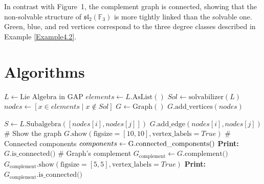 \documentclass[11pt]{amsart}
\theoremstyle{plain}
\def\F{\mathbb{F}}
\begin{document}
In contrast with Figure~1, the complement graph is connected, showing that the non-solvable structure of $\mathfrak{sl}_2(\F_3)$ is more tightly linked than the solvable one. Green, blue,  and red vertices correspond to the three degree classes described in Example \ref{Example4.2}.
 

\section{Algorithms}

\begin{algorithm}[H]
\caption{An algorithm to generate the solvable and non-solvable graphs of a finite  matrix Lie algebra $L$}
    \begin{algorithmic}
        \State $L \gets \text{Lie Algebra in GAP}$
        \State $elements \gets L.\text{AsList}()$
        \State $Sol \gets \text{solvabilizer}(L)$
        \State $nodes \gets [x \in elements \mid x \notin Sol]$
        \Statex
        \State $G \gets \text{Graph}()$
        \State $G. \text{add\_vertices}(nodes)$
        \Statex
        
                \State $S \gets L.\text{Subalgebra}([nodes[i], nodes[j]])$
                    \State $G.\text{add\_edge}(nodes[i], nodes[j])$
                \EndIf
            \EndFor
        \EndFor
        \Statex
        \State \# Show the graph
        \State $G.\text{show}(\text{figsize}=[10, 10], \text{vertex\_labels}=True)$
        \Statex
        \State \# Connected components
        \State $components \gets \text{G.\text{connected\_components}()}$
        \State \textbf{Print:} $G.\text{is\_connected()}$
        \Statex
        \State \# Graph's complement 
        \State $G_{\text{complement}} \gets G.\text{complement()}$
        \State $G_{\text{complement}}.\text{show}(\text{figsize}=[5, 5], \text{vertex\_labels}=True)$
        \State \textbf{Print:} $G_{\text{complement}}.\text{is\_connected()}$
    \end{algorithmic}
\end{algorithm}


 


    
\end{document}
